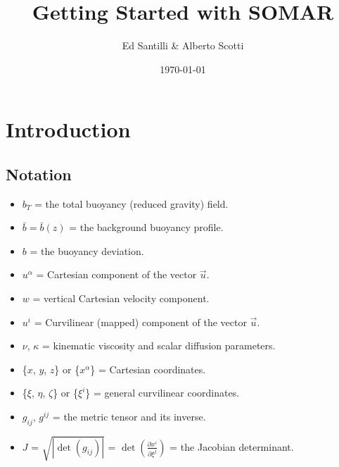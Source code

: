 \documentclass[12pt]{article}
\title{Getting Started with SOMAR}
\author{Ed Santilli \& Alberto Scotti}
\date{\today}
\begin{document}
 
%
\maketitle
\tableofcontents
\newpage
% 

\section{Introduction}

\subsection{Notation}\label{sec:notation}
\begin{itemize}
  \item $b_T$ = the total buoyancy (reduced gravity) field.
  \item $\bar{b} = \bar{b}(z)$ = the background buoyancy profile.
  \item $b$ = the buoyancy deviation.
  \item $u^\alpha$ = Cartesian component of the vector $\vec{u}$.
  \item $w$ = vertical Cartesian velocity component.
  \item $u^i$ = Curvilinear (mapped) component of the vector $\vec{u}$.
  \item $\nu$, $\kappa$ = kinematic viscosity and scalar diffusion parameters.
  \item \{$x$, $y$, $z$\} or \{$x^\alpha$\} = Cartesian coordinates.
  \item \{$\xi$, $\eta$, $\zeta$\} or \{$\xi^i$\} = general curvilinear coordinates.
  \item $g_{i j}$, $g^{i j}$ = the metric tensor and its inverse.
  \item $J$ = $\sqrt{\left|\det(g_{ij})\right|}$ = $\det\left(\frac{\partial x^i}{\partial \xi^j}\right)$ = the Jacobian determinant.

\end{itemize}
\end{document}
